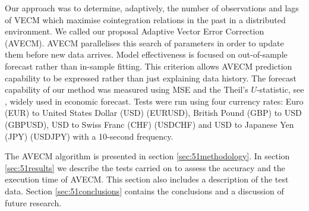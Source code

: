 Our approach was to determine, adaptively, the number of observations and lags of
VECM which maximise cointegration relations in the past in a distributed
environment. We called our proposal Adaptive Vector Error Correction (AVECM). 
AVECM parallelises this search of parameters in order to update them
before new data arrives. Model effectiveness is focused on out-of-sample
forecast rather than in-sample fitting. This criterion allows AVECM prediction
capability to be expressed rather than just explaining data history.  The
forecast capability of our method was measured using MSE and the Theil's
$U$-statistic, see \cite{theil1966}, widely used in economic forecast. Tests
were run using four currency rates: Euro (EUR) to United States Dollar (USD)
(EURUSD), British Pound (GBP) to USD (GBPUSD), USD to Swiss Franc (CHF) (USDCHF)
and USD to Japanese Yen (JPY) (USDJPY) with a 10-second frequency.

The AVECM algorithm is presented in section \ref{sec:51methodology}.
In section \ref{sec:51results} we describe the tests carried on to assess the
accuracy and the execution time of AVECM.  This section also includes a
description of the test data.  Section \ref{sec:51conclusions} contains the
conclusions and a discussion of future research.


